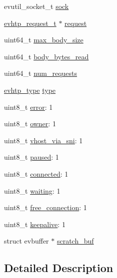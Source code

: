 \begin{DoxyCompactItemize}
\item 
evutil\-\_\-socket\-\_\-t \hyperlink{structevhtp__connection__s_a7544570bf388a535223a1e8e1b2301ac}{sock}
\item 
\hyperlink{evhtp_8h_a7adab4c0e9bd15e2b846c3adca6c37f7}{evhtp\-\_\-request\-\_\-t} $\ast$ \hyperlink{structevhtp__connection__s_a55db4995ccc7d4d06340bd057ff9f291}{request}
\item 
uint64\-\_\-t \hyperlink{structevhtp__connection__s_ac0c51866465cd3ccc68751b0ce806cbc}{max\-\_\-body\-\_\-size}
\item 
uint64\-\_\-t \hyperlink{structevhtp__connection__s_a1e939d2a1fb4d2559e1447b038b28a03}{body\-\_\-bytes\-\_\-read}
\item 
uint64\-\_\-t \hyperlink{structevhtp__connection__s_a56f90fa0eaddefea2d0b62057dd9276c}{num\-\_\-requests}
\item 
\hyperlink{evhtp_8h_aefdccd304fcda382d951a95b8eaa9bf2}{evhtp\-\_\-type} \hyperlink{structevhtp__connection__s_a6188c3148fbaafe2848b330c9f8f4732}{type}
\item 
uint8\-\_\-t \hyperlink{structevhtp__connection__s_adc64ccb7538429fe78e3fe0139267370}{error}\-: 1
\item 
uint8\-\_\-t \hyperlink{structevhtp__connection__s_a1c3b8d8797515eea0e86cbdb2d85aed6}{owner}\-: 1
\item 
uint8\-\_\-t \hyperlink{structevhtp__connection__s_a7f7e7921437e13781ac277814b976590}{vhost\-\_\-via\-\_\-sni}\-: 1
\item 
uint8\-\_\-t \hyperlink{structevhtp__connection__s_a84bd3ab7c2cbad7fb0b6233504515973}{paused}\-: 1
\item 
uint8\-\_\-t \hyperlink{structevhtp__connection__s_a91553b72c9b4759ddb48feffd7f2ffb1}{connected}\-: 1
\item 
uint8\-\_\-t \hyperlink{structevhtp__connection__s_ae6d06630954ffc71a965ae0b8e2a627a}{waiting}\-: 1
\item 
uint8\-\_\-t \hyperlink{structevhtp__connection__s_a185289ea80c6fe3d799b2897d98225ee}{free\-\_\-connection}\-: 1
\item 
uint8\-\_\-t \hyperlink{structevhtp__connection__s_aba0b971f0932db8772a9091c0da49728}{keepalive}\-: 1
\item 
struct evbuffer $\ast$ \hyperlink{structevhtp__connection__s_ad26039795d9657f7553e1deb2917d64c}{scratch\-\_\-buf}
\end{DoxyCompactItemize}


\subsection{Detailed Description}


